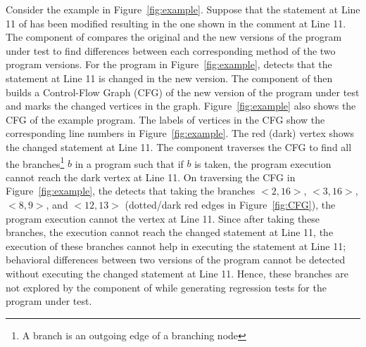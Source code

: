 	Consider the example in Figure~\ref{fig:example}. Suppose that the statement at Line 11 of  has been modified resulting in the one shown in the comment at Line 11.
	The  component of  compares the original and the new versions of the program under test to find differences between each corresponding method of the two program versions. For the program in Figure~\ref{fig:example},  detects that the statement at Line 11 is changed in the new version. The  component of  then builds a Control-Flow Graph (CFG) of the new version of  the program under test and marks the changed vertices in the graph. Figure~\ref{fig:example} also shows the CFG of the example program. The labels of vertices in the CFG show the corresponding line numbers in Figure~\ref{fig:example}. The red (dark) vertex shows the changed statement at Line 11. The  component traverses the CFG to find all the branches\footnote{A branch is an outgoing edge of a branching node} $b$ in a program such that if $b$ is taken, the program execution cannot reach the dark vertex at Line 11. 
	On traversing the CFG in Figure~\ref{fig:example}, the  detects that taking the branches $<2, 16>$, $<3, 16>$, $<8, 9>$, and $<12, 13>$ (dotted/dark red edges in Figure~\ref{fig:CFG}), the program execution cannot the vertex at Line 11. Since after taking these branches, the execution cannot reach the changed statement at Line 11, the execution of these branches cannot help in executing the statement at Line 11; behavioral differences between two versions of the program cannot be detected without executing the changed statement at Line 11. Hence, these branches are not explored by the  component of  while generating regression tests for the program under test. 
